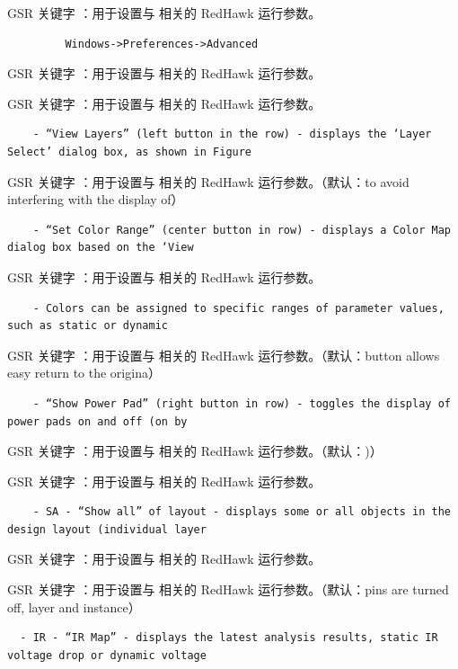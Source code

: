 GSR 关键字 ：用于设置与  相关的 RedHawk 运行参数。

\begin{lstlisting}
         Windows->Preferences->Advanced
\end{lstlisting}

GSR 关键字 ：用于设置与  相关的 RedHawk 运行参数。

GSR 关键字 ：用于设置与  相关的 RedHawk 运行参数。

\begin{lstlisting}
    - “View Layers” (left button in the row) - displays the ‘Layer Select’ dialog box, as shown in Figure
\end{lstlisting}

GSR 关键字 ：用于设置与  相关的 RedHawk 运行参数。（默认：to avoid interfering with the display of）

\begin{lstlisting}
    - “Set Color Range” (center button in row) - displays a Color Map dialog box based on the ‘View
\end{lstlisting}

GSR 关键字 ：用于设置与  相关的 RedHawk 运行参数。

\begin{lstlisting}
    - Colors can be assigned to specific ranges of parameter values, such as static or dynamic
\end{lstlisting}

GSR 关键字 ：用于设置与  相关的 RedHawk 运行参数。（默认：button allows easy return to the origina）

\begin{lstlisting}
    - “Show Power Pad” (right button in row) - toggles the display of power pads on and off (on by
\end{lstlisting}

GSR 关键字 ：用于设置与  相关的 RedHawk 运行参数。（默认：)）

GSR 关键字 ：用于设置与  相关的 RedHawk 运行参数。

\begin{lstlisting}
    - SA - “Show all” of layout - displays some or all objects in the design layout (individual layer
\end{lstlisting}

GSR 关键字 ：用于设置与  相关的 RedHawk 运行参数。

GSR 关键字 ：用于设置与  相关的 RedHawk 运行参数。（默认：pins are turned off, layer and instance）

\begin{lstlisting}
  - IR - “IR Map” - displays the latest analysis results, static IR voltage drop or dynamic voltage
\end{lstlisting}

